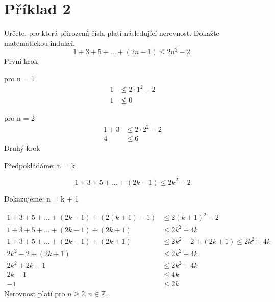 \section*{Příklad 2}
Určete, pro která přirozená čísla platí následující nerovnost. Dokažte matematickou indukcí.
$$ 1 + 3 + 5 + \hdots + (2n - 1) \leq 2n^2 - 2.$$
První krok

pro n = 1
\begin{equation*}
  \begin{aligned}
    1 & \nleq 2 \cdot 1^2 - 2 \\
    1 & \nleq 0
  \end{aligned}
\end{equation*}

pro n = 2
\begin{equation*}
  \begin{aligned}
    1 + 3 & \leq 2 \cdot 2^2 - 2 \\
    4     & \leq 6
  \end{aligned}
\end{equation*}
Druhý krok

Předpokládáme: n = k

$$ 1 + 3 + 5 + \hdots + (2k - 1) \leq 2k^2 - 2$$

Dokazujeme: n = k + 1

\begin{equation*}
  \begin{aligned}
    1 + 3 + 5 + \hdots + (2k - 1) + \left(2 \left(k + 1 \right) - 1 \right) & \leq 2(k+1)^2 - 2                       \\
    1 + 3 + 5 + \hdots + (2k - 1) + \left(2k + 1 \right)                    & \leq 2k^2 + 4k                          \\
    1 + 3 + 5 + \hdots + (2k - 1) + \left(2k + 1 \right)                    & \leq 2k^2 - 2 + (2k + 1) \leq 2k^2 + 4k \\
    2k^2 - 2 + (2k + 1)                                                     & \leq 2k^2 + 4k                          \\
    2k^2 + 2k - 1                                                           & \leq 2k^2 + 4k                          \\
    2k - 1                                                                  & \leq 4k                                 \\
    - 1                                                                     & \leq 2k
  \end{aligned}
\end{equation*}
Nerovnost platí pro $ n \geq 2, n \in \mathbb{Z} $.
